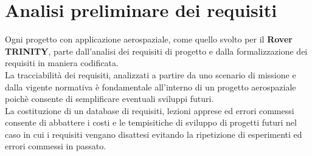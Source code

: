 \documentclass[%
corpo=11pt,
twoside,
 stile=classica,
oldstyle,
greek,%
]{toptesi}
\begin{document}
\section{Analisi preliminare dei requisiti}
Ogni progetto con applicazione aerospaziale, come quello svolto per il \textbf{Rover TRINITY}, parte dall'analisi dei requisiti di progetto e dalla formalizzazione dei requisiti in maniera codificata. \\
La tracciabilità dei requisiti, analizzati a partire da uno scenario di missione e dalla vigente normativa è fondamentale all'interno di un progetto aerospaziale poichè consente di semplificare eventuali sviluppi futuri.\\
La costituzione di un database di requisiti, lezioni apprese ed errori commessi consente di abbattere i costi e le tempisitiche di sviluppo di progetti futuri nel caso in cui i requisiti vengano disattesi evitando la ripetizione di esperimenti ed errori commessi in passato. 
\end{document}
